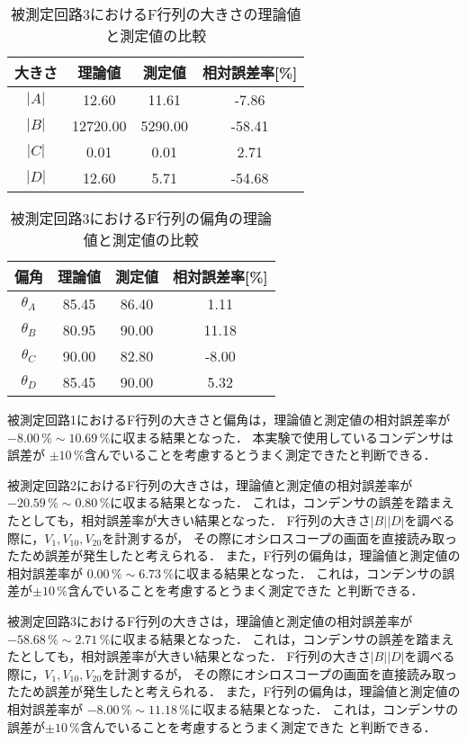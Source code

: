 \newpage

\begin{table}[!ht]
    \centering
    \caption{被測定回路3におけるF行列の大きさの理論値と測定値の比較}
    \begin{tabular}{c|ccc}
    \hline
        大きさ & 理論値 & 測定値 & 相対誤差率[\%] \\ \hline
        $|A|$ & 12.60 & 11.61 & -7.86 \\ 
        $|B|$ & 12720.00 & 5290.00 & -58.41 \\ 
        $|C|$ & 0.01 & 0.01 & 2.71 \\ 
        $|D|$ & 12.60 & 5.71 & -54.68 \\ 
    \end{tabular}
\end{table}

\begin{table}[!ht]
    \centering
    \caption{被測定回路3におけるF行列の偏角の理論値と測定値の比較}
    \begin{tabular}{c|ccc}
    \hline
        偏角 & 理論値 & 測定値 & 相対誤差率[\%] \\ \hline
        $\theta_A$ & 85.45 & 86.40 & 1.11 \\ 
        $\theta_B$ & 80.95 & 90.00 & 11.18 \\
        $\theta_C$ & 90.00 & 82.80 & -8.00 \\
        $\theta_D$ & 85.45 & 90.00 & 5.32 \\ 
    \end{tabular}
\end{table}

被測定回路1におけるF行列の大きさと偏角は，理論値と測定値の相対誤差率が
$-8.00\,\% \sim 10.69\,\%$に収まる結果となった．
本実験で使用しているコンデンサは誤差が
$\pm10\,\%$含んでいることを考慮するとうまく測定できたと判断できる．

被測定回路2におけるF行列の大きさは，理論値と測定値の相対誤差率が
$-20.59\,\% \sim 0.80\,\%$に収まる結果となった．
これは，コンデンサの誤差を踏まえたとしても，相対誤差率が大きい結果となった．
F行列の大きさ$|B||D|$を調べる際に，$V_1,V_{10},V_{20}$を計測するが，
その際にオシロスコープの画面を直接読み取ったため誤差が発生したと考えられる．
また，F行列の偏角は，理論値と測定値の相対誤差率が
$0.00\,\% \sim 6.73\,\%$に収まる結果となった．
これは，コンデンサの誤差が$\pm10\,\%$含んでいることを考慮するとうまく測定できた
と判断できる．

被測定回路3におけるF行列の大きさは，理論値と測定値の相対誤差率が
$-58.68\,\% \sim 2.71\,\%$に収まる結果となった．
これは，コンデンサの誤差を踏まえたとしても，相対誤差率が大きい結果となった．
F行列の大きさ$|B||D|$を調べる際に，$V_1,V_{10},V_{20}$を計測するが，
その際にオシロスコープの画面を直接読み取ったため誤差が発生したと考えられる．
また，F行列の偏角は，理論値と測定値の相対誤差率が
$-8.00\,\% \sim 11.18\,\%$に収まる結果となった．
これは，コンデンサの誤差が$\pm10\,\%$含んでいることを考慮するとうまく測定できた
と判断できる．

